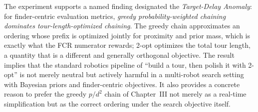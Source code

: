 The experiment supports a named finding designated the
\emph{Target-Delay Anomaly}: for finder-centric evaluation
metrics, \emph{greedy probability-weighted chaining dominates
tour-length-optimized chaining}. The greedy chain approximates an
ordering whose prefix is optimized jointly for proximity and prior
mass, which is exactly what the FCR numerator rewards; 2-opt
optimizes the total tour length, a quantity that is a different and
generally orthogonal objective. The result implies that the standard
robotics pipeline of ``build a tour, then polish it with 2-opt'' is
not merely neutral but actively harmful in a multi-robot search
setting with Bayesian priors and finder-centric objectives. It also
provides a concrete reason to prefer the greedy $p/d^2$ chain of
Chapter~III not merely as a real-time simplification but as the
correct ordering under the search objective itself.
